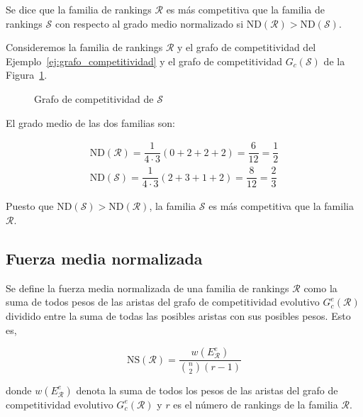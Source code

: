 \begin{defi}
Se dice que la familia de rankings $\mathcal{R}$ es más competitiva que la familia de rankings $\mathcal{S}$ con respecto al grado medio normalizado si $\mathrm{ND}(\mathcal{R}) > \mathrm{ND}(\mathcal{S})$.
\end{defi}

\begin{ejemplo}
Consideremos la familia de rankings $\mathcal{R}$ y el grafo de competitividad del Ejemplo~\ref{ej:grafo_competitividad} y el grafo de competitividad $G_c(\mathcal{S})$ de la Figura~\ref{fig:grado_medio}.\\

\begin{figure}[htb]
\centering
\ejemplogradomedio
\caption{Grafo de competitividad de $\mathcal{S}$}
\label{fig:grado_medio}
\end{figure}

El grado medio de las dos familias son:

\begin{eqnarray*}
\mathrm{ND}(\mathcal{R}) = \dfrac{1}{4\cdot 3} (0 + 2 + 2 + 2) = \dfrac{6}{12} = \dfrac{1}{2}\\
\mathrm{ND}(\mathcal{S}) = \dfrac{1}{4\cdot 3} (2 + 3 + 1 + 2) = \dfrac{8}{12} = \dfrac{2}{3}
\end{eqnarray*}

Puesto que $\mathrm{ND}(\mathcal{S}) > \mathrm{ND}(\mathcal{R})$, la familia $\mathcal{S}$ es más competitiva que la familia $\mathcal{R}$.
\end{ejemplo}

\subsection*{Fuerza media normalizada}

\begin{defi}
Se define la fuerza media normalizada de una familia de rankings $\mathcal{R}$ como la suma de todos pesos de las aristas del grafo de competitividad evolutivo $G_c^e(\mathcal{R})$ dividido entre la suma de todas las posibles aristas con sus posibles pesos. Esto es,

\begin{equation}
\mathrm{NS}(\mathcal{R}) = \dfrac{w(E_\mathcal{R}^e)}{\binom{n}{2} (r-1)}
\end{equation} 

donde $w(E_\mathcal{R}^e)$ denota la suma de todos los pesos de las aristas del grafo de competitividad evolutivo $G_c^e(\mathcal{R})$ y $r$ es el número de rankings de la familia $\mathcal{R}$.
\end{defi}

